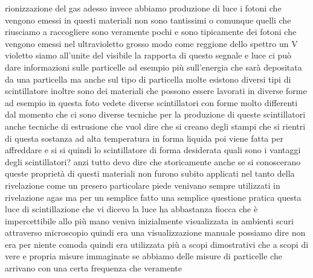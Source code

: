 rionizzazione del gas adesso invece abbiamo produzione di luce i fotoni che vengono emessi in questi materiali non sono tantissimi o comunque quelli che riusciamo a raccogliere sono veramente pochi e sono tipicamente dei fotoni che vengono emessi nel ultravioletto grosso modo come reggione dello spettro un V violetto siamo all'unite del visibile la rapporta di questo segnale e luce ci può dare informazioni sulle particelle ad esempio più sull'energia che sarà depositata da una particella ma anche sul tipo di particella molte esistono diversi tipi di scintillatore inoltre sono dei materiali che possono essere lavorati in diverse forme ad esempio in questa foto vedete diverse scintillatori con forme molto differenti dal momento che ci sono diverse tecniche per la produzione di queste scintillatori anche tecniche di estrusione che vuol dire che si creano degli stampi che si rientri di questa sostanza ad alta temperatura in forma liquida poi viene fatta per affreddare e si si quindi lo scintillatore di forma desiderata quali sono i vantaggi degli scintillatori? anzi tutto devo dire che storicamente anche se si conoscerano queste proprietà di questi materiali non furono subito applicati nel tanto della rivelazione come un presero particolare piede venivano sempre utilizzati in rivelazione agas ma per un semplice fatto una semplice questione pratica questa luce di scintillazione che vi dicevo la luce ha abbastanza fiocca che è impercettibile allo più mano veniva inizialmente visualizzata in ambienti scuri attraverso microscopio quindi era una visualizzazione manuale possiamo dire non era per niente comoda quindi era utilizzata più a scopi dimostrativi che a scopi di vere e propria misure immaginate se abbiamo delle misure di particelle che arrivano con una certa frequenza che veramente 

